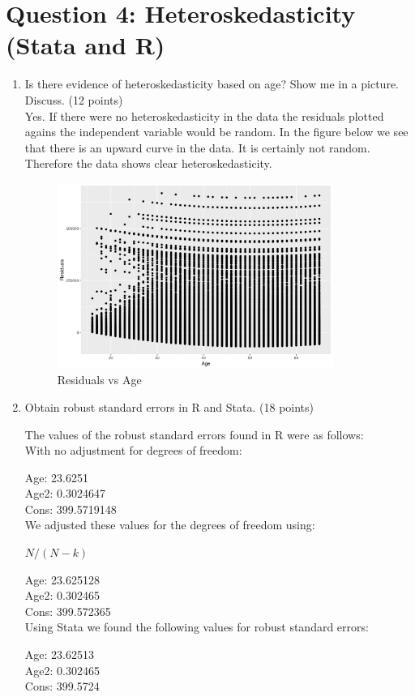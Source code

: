 \documentclass{article}
\begin{document}
\section{Question 4:  Heteroskedasticity (Stata and R)}

\begin{enumerate}[label=\alph*]

\item Is there evidence of heteroskedasticity based on age? Show me in a picture.
Discuss. (12 points)\\

Yes.  If there were no heteroskedasticity in the data the residuals plotted agains the independent variable would be random.  In the figure below we see that there is an upward curve in the data.  It is certainly not random.  Therefore the data shows clear heteroskedasticity.


\begin{figure}[ht!]
\centering
\includegraphics[width=90mm]{residuals.png}
\caption{Residuals vs Age \label{overflow}}
\end{figure}


\item Obtain robust standard errors in R and Stata. (18 points)

The values of the robust standard errors found in R were as follows:\\
With no adjustment for degrees of freedom:

Age:  23.6251\\
Age2:  0.3024647\\
Cons:  399.5719148\\

We adjusted these values for the degrees of freedom using:

$ N/(N-k)$

Age:  23.625128\\
Age2:  0.302465 \\
Cons:  399.572365\\

Using Stata we found the following values for robust standard errors:

Age:  23.62513\\
Age2:  0.302465 \\
Cons:  399.5724\\

\end{enumerate}
\end{document}
